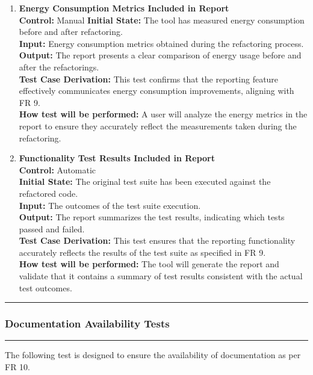\documentclass[12pt, titlepage]{article}
\newcommand{\colorrule}{\textcolor{BlueViolet}{\rule{\linewidth}{2pt}}}
\begin{document}
\begin{enumerate}[label={\bf \textcolor{Maroon}{test-FR-RP-\arabic*}}, wide=0pt, font=\itshape]
  \item \textbf{Energy Consumption Metrics Included in Report}\\[2mm]
    \textbf{Control:} Manual
    \textbf{Initial State:} The tool has measured energy consumption before and after refactoring.\\
    \textbf{Input:} Energy consumption metrics obtained during the refactoring process.\\
    \textbf{Output:} The report presents a clear comparison of energy usage before and after the refactorings.\\[2mm]
    \textbf{Test Case Derivation:} This test confirms that the reporting feature effectively communicates energy consumption improvements, aligning with FR 9.\\[2mm]
    \textbf{How test will be performed:} A user will analyze the energy metrics in the report to ensure they accurately reflect the measurements taken during the refactoring.

  \item \textbf{Functionality Test Results Included in Report}\\[2mm]
    \textbf{Control:} Automatic \\
    \textbf{Initial State:} The original test suite has been executed against the refactored code.\\
    \textbf{Input:} The outcomes of the test suite execution.\\
    \textbf{Output:} The report summarizes the test results, indicating which tests passed and failed.\\[2mm]
    \textbf{Test Case Derivation:} This test ensures that the reporting functionality accurately reflects the results of the test suite as specified in FR 9.\\[2mm]
    \textbf{How test will be performed:} The tool will generate the report and validate that it contains a summary of test results consistent with the actual test outcomes.
\end{enumerate}

\noindent
\colorrule

\subsubsection{Documentation Availability Tests}
\colorrule

\medskip

\noindent
The following test is designed to ensure the availability of documentation as per FR 10.
\end{document}
